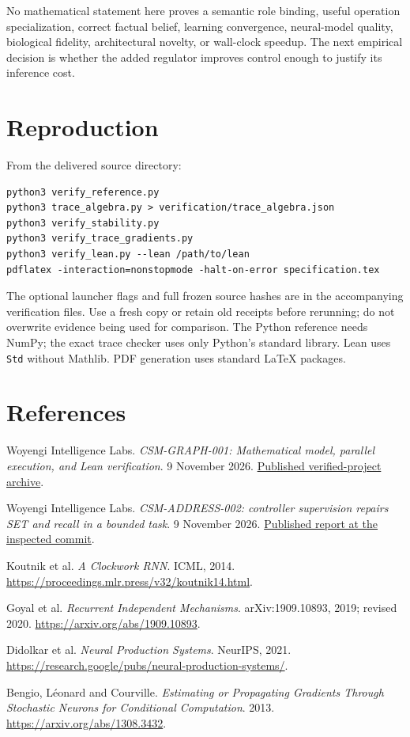 \documentclass[11pt,a4paper]{article}
\begin{document}
No mathematical statement here proves a semantic role binding, useful operation
specialization, correct factual belief, learning convergence, neural-model
quality, biological fidelity, architectural novelty, or wall-clock speedup.
The next empirical decision is whether the added regulator improves control
enough to justify its inference cost.

\section*{Reproduction}
From the delivered source directory:
\begin{verbatim}
python3 verify_reference.py
python3 trace_algebra.py > verification/trace_algebra.json
python3 verify_stability.py
python3 verify_trace_gradients.py
python3 verify_lean.py --lean /path/to/lean
pdflatex -interaction=nonstopmode -halt-on-error specification.tex
\end{verbatim}
The optional launcher flags and full frozen source hashes are in the accompanying
verification files. Use a fresh copy or retain old receipts before rerunning;
do not overwrite evidence being used for comparison. The Python reference needs
NumPy; the exact trace checker uses only Python's standard library. Lean uses
\texttt{Std} without Mathlib. PDF generation uses standard LaTeX packages.

\section*{References}
\begin{enumerate}[label={[\arabic*]}]
\item Woyengi Intelligence Labs. \emph{CSM-GRAPH-001: Mathematical model,
parallel execution, and Lean verification}. 9 November 2026.
\href{https://github.com/FPC-effortless/cdl-attention-experiment/blob/3edc4f1a541a3221390e4c0a21fe0c12004f1ca5/artifacts/csm-original-scope-reconstructed-20261109/CSM-GRAPH-001-verified-project.zip}{Published verified-project archive}.
\item Woyengi Intelligence Labs. \emph{CSM-ADDRESS-002: controller supervision
repairs SET and recall in a bounded task}. 9 November 2026.
\href{https://github.com/FPC-effortless/cdl-attention-experiment/blob/3edc4f1a541a3221390e4c0a21fe0c12004f1ca5/artifacts/csm-address-002-recovered-20261109/CSM-ADDRESS-002-results.md}{Published report at the inspected commit}.
\item Koutnik et al. \emph{A Clockwork RNN}. ICML, 2014.
\url{https://proceedings.mlr.press/v32/koutnik14.html}.
\item Goyal et al. \emph{Recurrent Independent Mechanisms}.
arXiv:1909.10893, 2019; revised 2020.
\url{https://arxiv.org/abs/1909.10893}.
\item Didolkar et al. \emph{Neural Production Systems}. NeurIPS, 2021.
\url{https://research.google/pubs/neural-production-systems/}.
\item Bengio, L\'eonard and Courville. \emph{Estimating or Propagating Gradients
Through Stochastic Neurons for Conditional Computation}. 2013.
\url{https://arxiv.org/abs/1308.3432}.
\end{enumerate}
\end{document}
